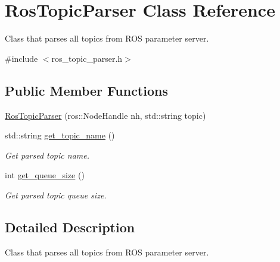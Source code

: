 \hypertarget{classRosTopicParser}{\section{Ros\-Topic\-Parser Class Reference}
\label{classRosTopicParser}
}


Class that parses all topics from R\-O\-S parameter server.  




{\ttfamily \#include $<$ros\-\_\-topic\-\_\-parser.\-h$>$}

\subsection*{Public Member Functions}
\begin{DoxyCompactItemize}
\item 
\hyperlink{classRosTopicParser_a99ed0a18a0184c77830a5039892d4722}{Ros\-Topic\-Parser} (ros\-::\-Node\-Handle nh, std\-::string topic)
\item 
\hypertarget{classRosTopicParser_aea4a849f4cbb7825aa72aad390ac261c}{std\-::string \hyperlink{classRosTopicParser_aea4a849f4cbb7825aa72aad390ac261c}{get\-\_\-topic\-\_\-name} ()}\label{classRosTopicParser_aea4a849f4cbb7825aa72aad390ac261c}

\begin{DoxyCompactList}\small\item\em Get parsed topic name. \end{DoxyCompactList}\item 
\hypertarget{classRosTopicParser_a807bc6a064e91c0731b946ce6d10ccf2}{int \hyperlink{classRosTopicParser_a807bc6a064e91c0731b946ce6d10ccf2}{get\-\_\-queue\-\_\-size} ()}\label{classRosTopicParser_a807bc6a064e91c0731b946ce6d10ccf2}

\begin{DoxyCompactList}\small\item\em Get parsed topic queue size. \end{DoxyCompactList}\end{DoxyCompactItemize}


\subsection{Detailed Description}
Class that parses all topics from R\-O\-S parameter server. 

